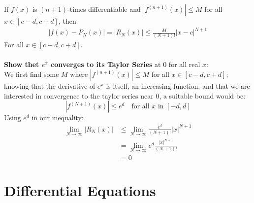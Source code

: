 \documentclass{report}
\begin{document}
If $f(x)$ is $(n+1)$-times differentiable and $|f^{(n+1)}(x)|\leq M$ for all $x\in[c-d,c+d]$, then
\begin{align*}
|f(x)-P_N(x)|=|R_N(x)|\leq\frac{M}{(N+1)!}|x-c|^{N+1}
\end{align*}
For all $x\in[c-d,c+d]$.\\
\vspace{1mm}\\ 
\textbf{Show thet $e^x$ converges to its Taylor Series} at 0 for all real $x$:\\
We first find some $M$ where $|f^{(n+1)}(x)|\leq M$ for all $x\in[c-d,c+d]$; knowing that the derivative of $e^x$ is itself, an increasing function,
and that we are interested in convergence to the taylor series near 0, a suitable bound would be:
\begin{equation*}
|f^{(N+1)}(x)|\leq e^d\quad\text{for all $x$ in $[-d,d]$}
\end{equation*}
Using $e^d$ in our inequality:
\begin{align*}
\lim_{N\to\infty}|R_N(x)|&\leq\lim_{N\to\infty}\frac{e^d}{(N+1)!}|x|^{N+1}\\
&=\lim_{N\to\infty}e^d\frac{|x|^{N+1}}{(N+1)!}\\
&=0
\end{align*}
\newpage

\section{Differential Equations}
\end{document}
